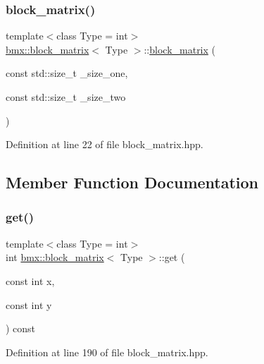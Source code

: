 \subsubsection{\texorpdfstring{block\+\_\+matrix()}{block\_matrix()}\hspace{0.1cm}{\footnotesize\ttfamily [2/2]}}
{\footnotesize\ttfamily template$<$class Type = int$>$ \\
\mbox{\hyperlink{classbmx_1_1block__matrix}{bmx\+::block\+\_\+matrix}}$<$ Type $>$\+::\mbox{\hyperlink{classbmx_1_1block__matrix}{block\+\_\+matrix}} (\begin{DoxyParamCaption}\item[{const std\+::size\+\_\+t}]{\+\_\+size\+\_\+one,  }\item[{const std\+::size\+\_\+t}]{\+\_\+size\+\_\+two }\end{DoxyParamCaption})\hspace{0.3cm}{\ttfamily [inline]}}



Definition at line 22 of file block\+\_\+matrix.\+hpp.



\subsection{Member Function Documentation}
\mbox{\label{classbmx_1_1block__matrix_a3a4e7a297cb5e09564f0a3b74cbdfaec}} 
\subsubsection{\texorpdfstring{get()}{get()}}
{\footnotesize\ttfamily template$<$class Type = int$>$ \\
int \mbox{\hyperlink{classbmx_1_1block__matrix}{bmx\+::block\+\_\+matrix}}$<$ Type $>$\+::get (\begin{DoxyParamCaption}\item[{const int}]{x,  }\item[{const int}]{y }\end{DoxyParamCaption}) const\hspace{0.3cm}{\ttfamily [inline]}}



Definition at line 190 of file block\+\_\+matrix.\+hpp.

\mbox{\label{classbmx_1_1block__matrix_ab8c567ac66dabb15646b951fe55f30b6}} 
